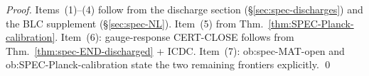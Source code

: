 \documentclass[12pt,oneside]{amsbook}
\theoremstyle{plain}
\theoremstyle{definition}
\theoremstyle{remark}
\begin{document}
\begin{proof}
Items~(1)--(4) follow from the discharge section
(§\ref{sec:spec-discharges}) and the BLC supplement (§\ref{sec:spec-NL}).
Item~(5) from Thm.~\ref{thm:SPEC-Planck-calibration}.
Item~(6): gauge-response CERT-CLOSE follows from
Thm.~\ref{thm:spec-END-discharged} + ICDC.
Item~(7): ob:spec-MAT-open and ob:SPEC-Planck-calibration state the
two remaining frontiers explicitly.
\qed
\end{proof}



 
\end{document}
